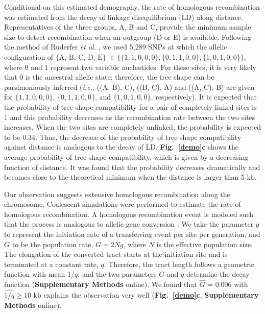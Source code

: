 \documentclass[twoside,twocolumn, letterpaper]{article}
\begin{document}
Conditional on this estimated demography, the rate of homologous recombination was estimated from the decay of linkage disequilibrium (LD) along distance. Representatives of the three groups, A, B and C, provide the minimum sample size to detect recombination when an outgroup (D or E) is available. Following the method of Ruderfer \emph{et al.} \cite{Ruderfer_2006_16892060}, we used 5,289 SNPs at which the allelic configuration of $\{\mbox{A, B, C, D, E}\}$ $\in\{\{1,1,0,0,0\},\{0,1,1,0,0\},\{1,0,1,0,0\}\}$, where 0 and 1 represent two variable nucleotides. For these sites, it is very likely that 0 is the ancestral allelic state; therefore, the tree shape can be parsimoniously inferred (\emph{i.e.,} ((A, B), C), ((B, C), A) and ((A, C), B) are given for $\{1,1,0,0,0\}$, $\{0,1,1,0,0\}$, and $\{1,0,1,0,0\}$, respectively). It is expected that the probability of tree-shape compatibility for a pair of completely linked sites is 1 and this probability decreases as the recombination rate between the two sites increases. When the two sites are completely unlinked, the probability is expected to be 0.34. Thus, the decrease of the probability of tree-shape compatibility against distance is analogous to the decay of LD. {\bf Fig.~\ref{demo}c} shows the average probability of tree-shape compatibility, which is given by a decreasing function of distance. It was found that the probability decreases dramatically and becomes close to the theoretical minimum when the distance is larger than 5 kb. 


Our observation suggests extensive homologous recombination along the chromosome. Coalescent simulations were performed to estimate the rate of homologous recombination. A homologous recombination event is modeled such that the process is analogous to allelic gene conversion \cite{Wiuf_2000_10790416,Didelot_2007_17151252}. We take the parameter $g$ to represent the initiation rate of a transferring event per site per generation, and $G$ to be the population rate, $G=2Ng$, where $N$ is the effective population size. The elongation of the converted tract starts at the initiation site and is terminated at a constant rate, $q$. Therefore, the tract length follows a geometric function with mean $1/q$, and the two parameters $G$ and $q$ determine the decay function ({\bf Supplementary Methods} online). We found that $\hat{G}$ = 0.006 with $\hat{1/q} \geq 10$ kb explains the observation very well ({\bf Fig.~\ref{demo}c}, {\bf Supplementary Methods} online). 
\end{document}
